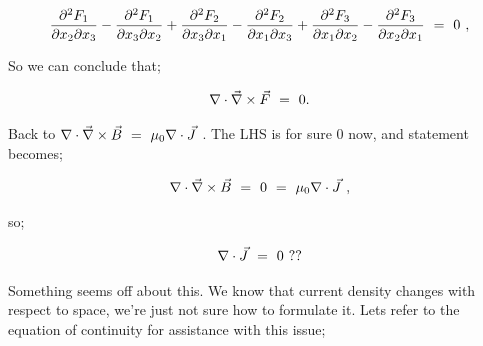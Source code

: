 \documentclass{article}
\begin{document}
\begin{equation} \label{eb-eq-51-27}
\frac{\partial^{2}{F_1}}{\partial{x_2} \partial{x_3}} - \frac{\partial^{2}{F_1}}{\partial{x_3} \partial{x_2}} + \frac{\partial^{2}{F_2}}{\partial{x_3} \partial{x_1}} -  \frac{\partial^{2}{F_2}}{\partial{x_1} \partial{x_3}} + \frac{\partial^{2}{F_3}}{\partial{x_1} \partial{x_2}} - \frac{\partial^{2}{F_3}}{\partial{x_2} \partial{x_1}} \hspace{0.125cm} = \hspace{0.125cm} 0 \hspace{0.125cm} ,
\end{equation}

So we can conclude that;

\begin{equation} \label{eb-eq-51-28}
\nabla\cdot\vec{\nabla} \times \vec{F} \hspace{0.125cm} = \hspace{0.125cm} 0 .
\end{equation}

Back to \begin{math} \nabla\cdot\vec{\nabla} \times \vec{B} \hspace{0.125cm} = \hspace{0.125cm} \mu_{0} \nabla\cdot\vec{J} \hspace{0.125cm} \end{math}. The LHS is for sure \begin{math} 0 \end{math} now, and statement becomes;

\begin{equation} \label{eb-eq-51-29}
\nabla\cdot\vec{\nabla} \times \vec{B} \hspace{0.125cm} =  \hspace{0.125cm} 0 \hspace{0.125cm} = \hspace{0.125cm} \mu_{0} \nabla\cdot\vec{J} \hspace{0.125cm} ,
\end{equation}

so;

\begin{equation} \label{eb-eq-51-30}
\nabla\cdot\vec{J} \hspace{0.125cm} = \hspace{0.125cm} 0 \hspace{0.125cm} ??
\end{equation}

Something seems off about this. We know that current density changes with respect to space, we're just not sure how to formulate it. Lets refer to the equation of continuity for assistance with this issue;
\end{document}
